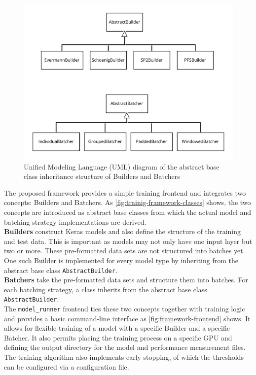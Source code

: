 \begin{figure}
    \centering
    \includegraphics[width=\textwidth]{gfx/training-framework-classes.png}
    \caption[UML diagram of the framework classes]{Unified Modeling Language (UML) diagram of the abstract base class inheritance structure of Builders and Batchers}
    \label{fig:trainig-framework-classes}
\end{figure}

The proposed framework provides a simple training frontend and integrates two concepts: Builders and Batchers. As \autoref{fig:trainig-framework-classes} shows, the two concepts are introduced as abstract base classes from which the actual model and batching strategy implementations are derived.\\

\noindent\textbf{Builders} construct Keras models and also define the structure of the training and test data. This is important as models may not only have one input layer but two or more. These pre-formatted data sets are not structured into batches yet. One such Builder is implemented for every model type by inheriting from the abstract base class \verb=AbstractBuilder=.\\

\noindent\textbf{Batchers} take the pre-formatted data sets and structure them into batches. For each batching strategy, a class inherits from the abstract base class \verb=AbstractBuilder=.\\

\noindent The \verb=model_runner= frontend ties these two concepts together with training logic and provides a basic command-line interface as \autoref{fig:framework-frontend} shows. It allows for flexible training of a model with a specific Builder and a specific Batcher. It also permits placing the training process on a specific GPU and defining the output directory for the model and performance measurement files. The training algorithm also implements early stopping, of which the thresholds can be configured via a configuration file.\\

